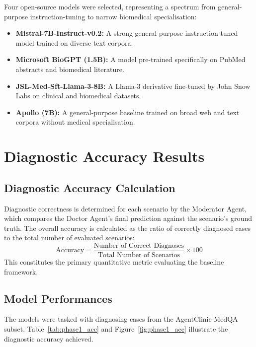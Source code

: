 Four open-source models were selected, representing a spectrum from general-purpose instruction-tuning to narrow biomedical specialisation:
\begin{itemize}
    \item \textbf{Mistral-7B-Instruct-v0.2:} A strong general-purpose instruction-tuned model trained on diverse text corpora.
    \item \textbf{Microsoft BioGPT (1.5B):} A model pre-trained specifically on PubMed abstracts and biomedical literature.
    \item \textbf{JSL-Med-Sft-Llama-3-8B:} A Llama-3 derivative fine-tuned by John Snow Labs on clinical and biomedical datasets.
    \item \textbf{Apollo (7B):} A general-purpose baseline trained on broad web and text corpora without medical specialisation.
\end{itemize}

\section{Diagnostic Accuracy Results}

\subsection{Diagnostic Accuracy Calculation}

Diagnostic correctness is determined for each scenario by the Moderator Agent, which compares the Doctor Agent's final prediction against the scenario's ground truth. The overall accuracy is calculated as the ratio of correctly diagnosed cases to the total number of evaluated scenarios:
\[
\text{Accuracy} = \frac{\text{Number of Correct Diagnoses}}{\text{Total Number of Scenarios}} \times 100
\]
This constitutes the primary quantitative metric evaluating the baseline framework.

\subsection{Model Performances}

The models were tasked with diagnosing cases from the AgentClinic-MedQA subset. Table~\ref{tab:phase1_acc} and Figure~\ref{fig:phase1_acc} illustrate the diagnostic accuracy achieved.

